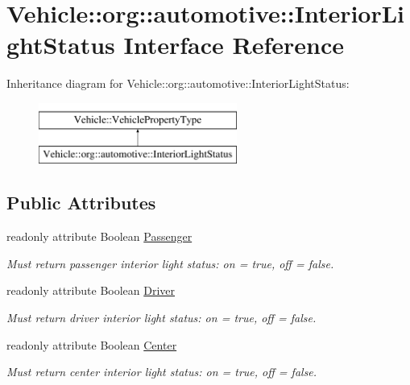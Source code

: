 \hypertarget{interfaceVehicle_1_1org_1_1automotive_1_1InteriorLightStatus}{\section{Vehicle\-:\-:org\-:\-:automotive\-:\-:Interior\-Light\-Status Interface Reference}
\label{interfaceVehicle_1_1org_1_1automotive_1_1InteriorLightStatus}
}
Inheritance diagram for Vehicle\-:\-:org\-:\-:automotive\-:\-:Interior\-Light\-Status\-:\begin{figure}[H]
\begin{center}
\leavevmode
\includegraphics[height=2.000000cm]{interfaceVehicle_1_1org_1_1automotive_1_1InteriorLightStatus}
\end{center}
\end{figure}
\subsection*{Public Attributes}
\begin{DoxyCompactItemize}
\item 
readonly attribute Boolean \hyperlink{interfaceVehicle_1_1org_1_1automotive_1_1InteriorLightStatus_a0cca15fc296c535779d6ce938435ab9e}{Passenger}
\begin{DoxyCompactList}\small\item\em Must return passenger interior light status\-: on = true, off = false. \end{DoxyCompactList}\item 
readonly attribute Boolean \hyperlink{interfaceVehicle_1_1org_1_1automotive_1_1InteriorLightStatus_a9be258cd372a083798606ff38756e2c4}{Driver}
\begin{DoxyCompactList}\small\item\em Must return driver interior light status\-: on = true, off = false. \end{DoxyCompactList}\item 
readonly attribute Boolean \hyperlink{interfaceVehicle_1_1org_1_1automotive_1_1InteriorLightStatus_a65621027e7b993a02569f0e4ace51aff}{Center}
\begin{DoxyCompactList}\small\item\em Must return center interior light status\-: on = true, off = false. \end{DoxyCompactList}\end{DoxyCompactItemize}


